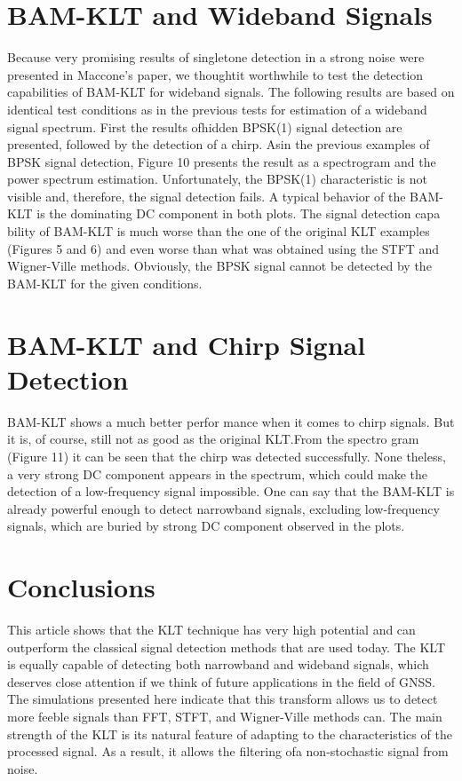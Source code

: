\documentclass[12pt]{report}
\begin{document}
\section*{BAM-KLT and Wideband Signals}
Because very promising results of singletone detection in a strong noise were presented in Maccone's paper, we thoughtit worthwhile to test the detection capabilities of BAM-KLT for wideband signals. The following results are based on identical test conditions as in the previous tests for estimation of a wideband signal spectrum. First the results ofhidden BPSK(1) signal detection are presented, followed by the detection of a chirp.
Asin the previous examples of BPSK signal detection, Figure 10 presents the result as a spectrogram and the power spectrum estimation. Unfortunately, the BPSK(1) characteristic is not visible and, therefore, the signal detection fails.
A typical behavior of the BAM-KLT is the dominating DC component in both plots. The signal detection capa
bility of BAM-KLT is much worse than
the one of the original KLT examples
(Figures 5 and 6) and even worse than
what was obtained using the STFT and
Wigner-Ville methods. Obviously, the
BPSK signal cannot be detected by the
BAM-KLT for the given conditions.
\section*{BAM-KLT and Chirp Signal Detection}
BAM-KLT shows a much better perfor
mance when it comes to chirp signals.
But it is, of course, still not as good as
the original KLT.\@ From the spectro
gram (Figure 11) it can be seen that the
chirp was detected successfully. None
theless, a very strong DC component
appears in the spectrum, which could
make the detection of a low-frequency
signal impossible. One can say that the
BAM-KLT is already powerful enough
to detect narrowband signals, excluding
low-frequency signals, which are buried
by strong DC component observed in
the plots.
\section*{Conclusions}
This article shows that the KLT technique has very high potential and can outperform the classical signal detection methods that are used today. The KLT is equally capable of detecting both narrowband and wideband signals, which deserves close attention if
we think of future applications in the field of GNSS. The simulations presented here indicate that this transform allows us to detect more feeble signals than FFT, STFT, and Wigner-Ville methods can. The main strength of the KLT is its natural feature of adapting to the characteristics of the processed signal. As a result, it allows the filtering ofa non-stochastic signal from noise.
\end{document}
